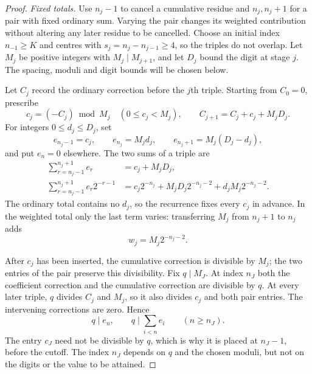 \documentclass[11pt]{article}
\begin{document}
\begin{proof}
\emph{Fixed totals.}
Use $n_j-1$ to cancel a cumulative residue and $n_j,n_j+1$ for a
pair with fixed ordinary sum.  Varying the pair changes its weighted
contribution without altering any later residue to be cancelled.
Choose an initial index $n_{-1}\ge K$ and centres with
$s_j=n_j-n_{j-1}\ge4$, so the triples do not overlap.  Let
$M_j$ be positive integers with $M_j\mid M_{j+1}$, and let $D_j$
bound the digit at stage $j$.  The spacing, moduli and digit bounds
will be chosen below.

Let $C_j$ record the ordinary correction before the $j$th triple.
Starting from $C_0=0$, prescribe
\[
 c_j=(-C_j)\bmod M_j\quad(0\le c_j<M_j),\qquad
 C_{j+1}=C_j+c_j+M_jD_j.
\]
For integers $0\le d_j\le D_j$, set
\begin{equation}\label{long251:eq:sparse-triple}
 e_{n_j-1}=c_j,\qquad e_{n_j}=M_jd_j,\qquad
 e_{n_j+1}=M_j(D_j-d_j),
\end{equation}
and put $e_n=0$ elsewhere.  The two sums of a triple are
\[
 \begin{aligned}
 \sum_{r=n_j-1}^{n_j+1}e_r
    &=c_j+M_jD_j,\\
 \sum_{r=n_j-1}^{n_j+1}e_r2^{-r-1}
    &=c_j2^{-n_j}+M_jD_j2^{-n_j-2}+d_jM_j2^{-n_j-2}.
 \end{aligned}
\]
The ordinary total contains no $d_j$, so the recurrence fixes every
$c_j$ in advance.  In the weighted total only the last term varies:
transferring $M_j$ from $n_j+1$ to $n_j$ adds
\[
 w_j=M_j2^{-n_j-2}.
\]

After $c_j$ has been inserted, the cumulative correction is divisible
by $M_j$; the two entries of the pair preserve this divisibility.
Fix $q\mid M_J$.  At index $n_J$ both the coefficient correction and
the cumulative correction are divisible by $q$.  At every later
triple, $q$ divides $C_j$ and $M_j$, so it also divides $c_j$ and
both pair entries.  The intervening corrections are zero.  Hence
\[
 q\mid e_n,\qquad q\mid\sum_{i<n}e_i\qquad(n\ge n_J).
\]
The entry $c_J$ need not be divisible by $q$, which is why it is placed at
$n_J-1$, before the cutoff.  The index $n_J$ depends on $q$ and the chosen
moduli, but not on the digits or the value to be attained.


\end{proof}
\end{document}

